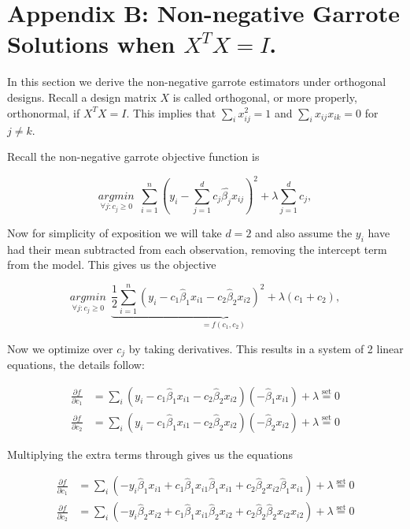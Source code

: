 \section*{Appendix B: Non-negative Garrote Solutions when $X^TX = I$.}

In this section we derive the non-negative garrote estimators under orthogonal designs. Recall a design matrix $X$ is called orthogonal, or more properly, orthonormal, if $X^TX=I$. This implies that $\sum_ix_{ij}^2=1$ and $\sum_ix_{ij}x_{ik}=0$ for $j\neq k$. 

Recall the non-negative garrote objective function is 

\begin{equation}\label{eqn:nn_garrote_obj}
\underset{\forall j: c_j\geq 0}{argmin}\ \ \sum_{i=1}^n(y_i -\sum_{j=1}^dc_j\hat{\beta_j}x_{ij})^2 + \lambda\sum_{j=1}^dc_j,
\end{equation}    

Now for simplicity of exposition we will take $d=2$ and also assume the $y_i$ have had their mean subtracted from each observation, removing the intercept term from the model. This gives us the objective 

\begin{equation}\label{eqn:nn_garroted=2}
\underset{\forall j: c_j\geq 0}{argmin}\ \ \underbrace{\frac{1}{2}\sum_{i=1}^n(y_i -c_1\hat{\beta}_1x_{i1}-c_2\hat{\beta}_2x_{i2})^2 + \lambda(c_1+c_2)}_{=f(c_1,c_2)},
\end{equation}    

Now we optimize over $c_j$ by taking derivatives. This results in a system of 2 linear equations, the details follow: 

\begin{align}
\frac{\partial f}{\partial c_1} &= \sum_i(y_i-c_1\hat{\beta}_1x_{i1}-c_2\hat{\beta}_2x_{i2})(-\hat{\beta}_1x_{i1}) + \lambda \overset{\text{set}}{=} 0\\
\frac{\partial f}{\partial c_2} &= \sum_i(y_i-c_1\hat{\beta}_1x_{i1}-c_2\hat{\beta}_2x_{i2})(-\hat{\beta}_2x_{i2}) +\lambda \overset{\text{set}}{=} 0
\end{align}

Multiplying the extra terms through gives us the equations

\begin{align}
\frac{\partial f}{\partial c_1} &=  \sum_i(-y_i\hat{\beta}_1x_{i1}+c_1\hat{\beta}_1x_{i1}\hat{\beta}_1x_{i1}+c_2\hat{\beta}_2x_{i2}\hat{\beta}_1x_{i1})+\lambda \overset{\text{set}}{=} 0\\
\frac{\partial f}{\partial c_2} &= \sum_i(-y_i\hat{\beta}_2x_{i2}+c_1\hat{\beta}_1x_{i1}\hat{\beta}_2x_{i2}+c_2\hat{\beta}_2\hat{\beta}_2x_{i2}x_{i2}) +\lambda\overset{\text{set}}{=} 0
\end{align}

